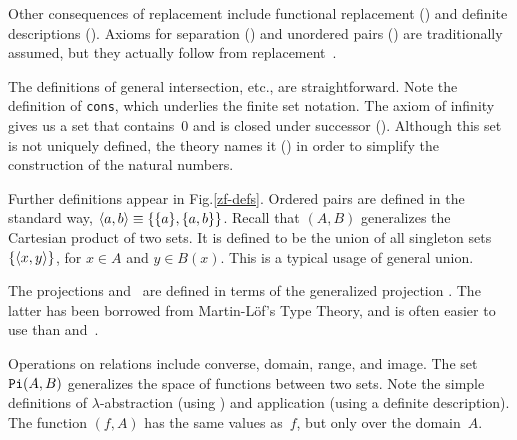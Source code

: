 Other consequences of replacement include functional replacement
() and definite descriptions ().
Axioms for separation () and unordered pairs
() are traditionally assumed, but they actually follow
from replacement~\cite[pages 237--8]{suppes72}.

The definitions of general intersection, etc., are straightforward.  Note
the definition of \texttt{cons}, which underlies the finite set notation.
The axiom of infinity gives us a set that contains~0 and is closed under
successor ().  Although this set is not uniquely defined,
the theory names it () in order to simplify the
construction of the natural numbers.
                                             
Further definitions appear in Fig.\ts\ref{zf-defs}.  Ordered pairs are
defined in the standard way, $\langle a,b\rangle\equiv\{\{a\},\{a,b\}\}$.  Recall
that $(A,B)$ generalizes the Cartesian product of two
sets.  It is defined to be the union of all singleton sets
$\{\langle x,y\rangle\}$, for $x\in A$ and $y\in B(x)$.  This is a typical usage of
general union.

The projections  and~ are defined in terms of the
generalized projection .  The latter has been borrowed from
Martin-L\"of's Type Theory, and is often easier to use than 
and~.

Operations on relations include converse, domain, range, and image.  The
set ${\tt Pi}(A,B)$ generalizes the space of functions between two sets.
Note the simple definitions of $\lambda$-abstraction (using
) and application (using a definite description).  The
function $(f,A)$ has the same values as~$f$, but only
over the domain~$A$.



